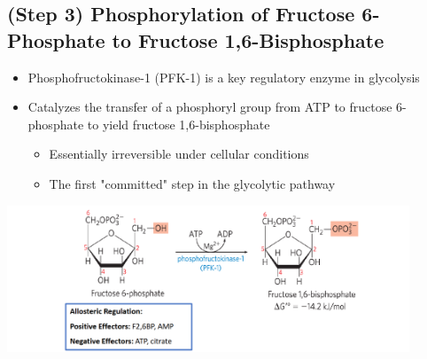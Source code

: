 \documentclass[10pt]{article}
\begin{document}
\subsection*{(Step 3) Phosphorylation of Fructose 6-Phosphate to Fructose 1,6-Bisphosphate}
\begin{itemize}
	\item Phosphofructokinase-1 (PFK-1) is a key regulatory enzyme in glycolysis
	\item Catalyzes the transfer of a phosphoryl group from ATP to fructose 6-phosphate to yield fructose 1,6-bisphosphate
	\begin{itemize}
        \item Essentially irreversible under cellular conditions
        \item The first "committed" step in the glycolytic pathway
    \end{itemize}
\end{itemize}
\begin{center} 
	\includegraphics*[width=0.9\textwidth]{L1_6.png}
\end{center}
\end{document}
